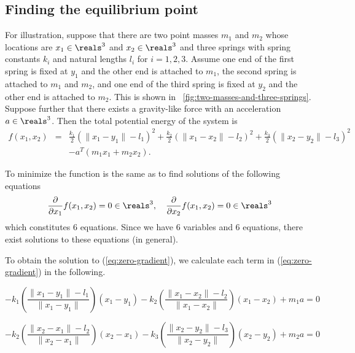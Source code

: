 \documentclass{article}
\begin{document}
\subsection{Finding the equilibrium point}

For illustration,
suppose that there are two point masses
$m_1$ and $m_2$ whose locations are $x_1\in\reals^3$ and $x_2\in\reals^3$
and three springs with spring constants $k_i$ and natural lengths $l_i$ for $i=1,2,3$.
Assume one end of the first spring is fixed at $y_1$ and the other end is attached to $m_1$,
the second spring is attached to $m_1$ and $m_2$,
and one end of the third spring is fixed at $y_2$ and the other end is attached to $m_2$.
This is shown in \figurename~\ref{fig:two-masses-and-three-springs}.
Suppose further that there exists a gravity-like force with an acceleration $a\in\reals^3$.
Then the total potential energy of the system is
\begin{eqnarray}
\nonumber
f(x_1,x_2)&=&
\frac{k_1}{2} (\|x_1-y_1\|-l_1)^2
+\frac{k_2}{2} (\|x_1-x_2\|-l_2)^2
+\frac{k_3}{2} (\|x_2-y_2\|-l_3)^2
\\
\label{eq:sum-of-potential-energies}
&&
-a^T(m_1x_1+m_2x_2).
\end{eqnarray}

To minimize the function
is the same as to find solutions of
the following equations
\begin{equation}
\label{eq:zero-gradient}
\frac{\partial}{\partial x_1} f(x_1,x_2) = 0 \in\reals^3,
\quad
\frac{\partial}{\partial x_2} f(x_1,x_2) = 0 \in\reals^3
\end{equation}
which constitutes $6$ equations.
Since we have $6$ variables and $6$ equations,
there exist solutions to these equations (in general).

To obtain the solution to (\ref{eq:zero-gradient}),
we calculate each term in (\ref{eq:zero-gradient}) in the following.

\begin{equation}
\label{eq:force:1}
-k_1\left(\frac{\|x_1-y_1\| -l_1}{\|x_1-y_1\|}\right) (x_1-y_1)
-k_2\left(\frac{\|x_1-x_2\| -l_2}{\|x_1-x_2\|}\right) (x_1-x_2)
+ m_1 a
= 0
\end{equation}

\begin{equation}
\label{eq:force:2}
-k_2\left(\frac{\|x_2-x_1\| -l_2}{\|x_2-x_1\|}\right) (x_2-x_1)
-k_3\left(\frac{\|x_2-y_2\| -l_3}{\|x_2-y_2\|}\right) (x_2-y_2)
+ m_2 a
= 0
\end{equation}
\end{document}
